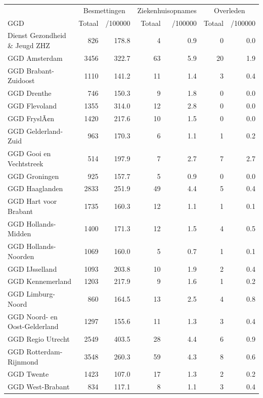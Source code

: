 \documentclass[
  english,
  man,floatsintext]{apa6}
\begin{document}
\begin{table}
\centering\begingroup\fontsize{10}{12}\selectfont

\begin{threeparttable}
\begin{tabular}{lrrrrrr}
\toprule
\multicolumn{1}{c}{ } & \multicolumn{2}{c}{Besmettingen} & \multicolumn{2}{c}{Ziekenhuisopnames} & \multicolumn{2}{c}{Overleden} \\
\cmidrule(l{3pt}r{3pt}){2-3} \cmidrule(l{3pt}r{3pt}){4-5} \cmidrule(l{3pt}r{3pt}){6-7}
GGD & Totaal & /100000 & Totaal & /100000 & Totaal & /100000\\
\midrule
Dienst Gezondheid \& Jeugd ZHZ & 826 & 178.8 & 4 & 0.9 & 0 & 0.0\\
GGD Amsterdam & 3456 & 322.7 & 63 & 5.9 & 20 & 1.9\\
GGD Brabant-Zuidoost & 1110 & 141.2 & 11 & 1.4 & 3 & 0.4\\
GGD Drenthe & 746 & 150.3 & 9 & 1.8 & 0 & 0.0\\
GGD Flevoland & 1355 & 314.0 & 12 & 2.8 & 0 & 0.0\\
GGD FryslÃ¢n & 1420 & 217.6 & 10 & 1.5 & 0 & 0.0\\
GGD Gelderland-Zuid & 963 & 170.3 & 6 & 1.1 & 1 & 0.2\\
GGD Gooi en Vechtstreek & 514 & 197.9 & 7 & 2.7 & 7 & 2.7\\
GGD Groningen & 925 & 157.7 & 5 & 0.9 & 0 & 0.0\\
GGD Haaglanden & 2833 & 251.9 & 49 & 4.4 & 5 & 0.4\\
GGD Hart voor Brabant & 1735 & 160.3 & 12 & 1.1 & 1 & 0.1\\
GGD Hollands-Midden & 1400 & 171.3 & 12 & 1.5 & 4 & 0.5\\
GGD Hollands-Noorden & 1069 & 160.0 & 5 & 0.7 & 1 & 0.1\\
GGD IJsselland & 1093 & 203.8 & 10 & 1.9 & 2 & 0.4\\
GGD Kennemerland & 1203 & 217.9 & 9 & 1.6 & 1 & 0.2\\
GGD Limburg-Noord & 860 & 164.5 & 13 & 2.5 & 4 & 0.8\\
GGD Noord- en Oost-Gelderland & 1297 & 155.6 & 11 & 1.3 & 3 & 0.4\\
GGD Regio Utrecht & 2549 & 403.5 & 28 & 4.4 & 6 & 0.9\\
GGD Rotterdam-Rijnmond & 3548 & 260.3 & 59 & 4.3 & 8 & 0.6\\
GGD Twente & 1423 & 107.0 & 17 & 1.3 & 2 & 0.2\\
GGD West-Brabant & 834 & 117.1 & 8 & 1.1 & 3 & 0.4\\

\end{tabular}
\end{threeparttable}
\end{table}
\end{document}
